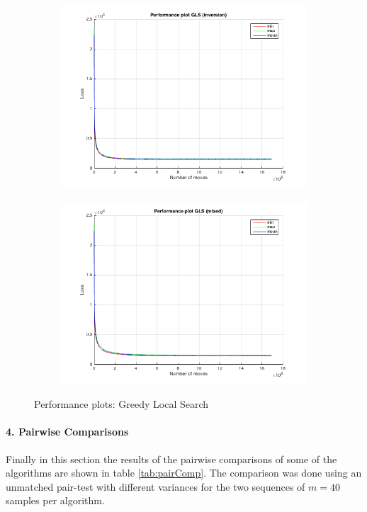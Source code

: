 \documentclass{paper}
\begin{document}
\begin{figure}[!h]
{\begin{subfigure}[]{0.7\linewidth}
        		\includegraphics[width=\linewidth]{GLS(inversion)_performance}
    	\end{subfigure}%
    	\begin{subfigure}[]{0.7\linewidth}
		\centering
        		\includegraphics[width=\linewidth]{GLS(mixed)_performance}
    	\end{subfigure}
    }
    \caption{Performance plots: Greedy Local Search}    
\label{fig:GLSPerf}
\end{figure}

\paragraph{4. Pairwise Comparisons}
Finally in this section the results of the pairwise comparisons of some of the algorithms are shown in table \ref{tab:pairComp}. The comparison was done using an unmatched pair-test with different variances for the two sequences of $m=40$ samples per algorithm.
\end{document}
